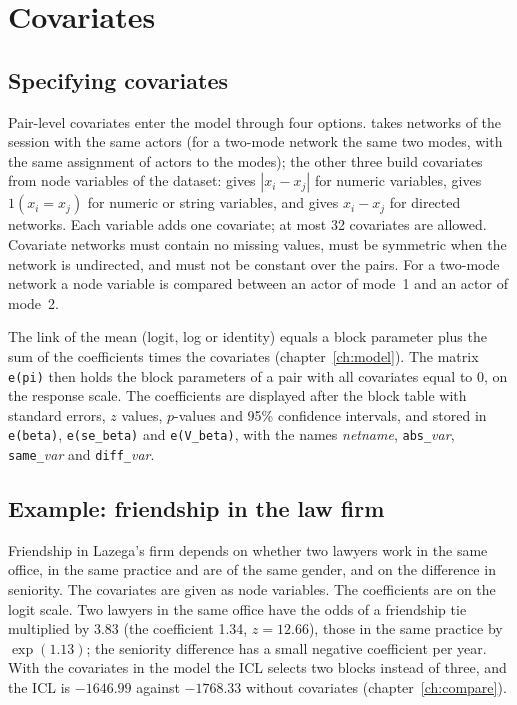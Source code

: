 \chapter{Covariates}\label{ch:cov}

\section{Specifying covariates}
Pair-level covariates enter the model through four options.  takes networks of the session with the same actors (for a two-mode network the same two modes, with the same assignment of actors to the modes); the other three build covariates from node variables of the dataset:  gives $|x_i-x_j|$ for numeric variables,  gives $1(x_i=x_j)$ for numeric or string variables, and  gives $x_i-x_j$ for directed networks. Each variable adds one covariate; at most 32 covariates are allowed. Covariate networks must contain no missing values, must be symmetric when the network is undirected, and must not be constant over the pairs. For a two-mode network a node variable is compared between an actor of mode~1 and an actor of mode~2.

The link of the mean (logit, log or identity) equals a block parameter plus the sum of the coefficients times the covariates (chapter~\ref{ch:model}). The matrix \texttt{e(pi)} then holds the block parameters of a pair with all covariates equal to 0, on the response scale. The coefficients are displayed after the block table with standard errors, $z$ values, $p$-values and 95\% confidence intervals, and stored in \texttt{e(beta)}, \texttt{e(se\_beta)} and \texttt{e(V\_beta)}, with the names \emph{netname}, \texttt{abs\_}\emph{var}, \texttt{same\_}\emph{var} and \texttt{diff\_}\emph{var}.

\section{Example: friendship in the law firm}
Friendship in Lazega's firm depends on whether two lawyers work in the same office, in the same practice and are of the same gender, and on the difference in seniority. The covariates are given as node variables.
The coefficients are on the logit scale. Two lawyers in the same office have the odds of a friendship tie multiplied by 3.83 (the coefficient 1.34, $z=12.66$), those in the same practice by $\exp(1.13)$; the seniority difference has a small negative coefficient per year. With the covariates in the model the ICL selects two blocks instead of three, and the ICL is $-1646.99$ against $-1768.33$ without covariates (chapter~\ref{ch:compare}).

